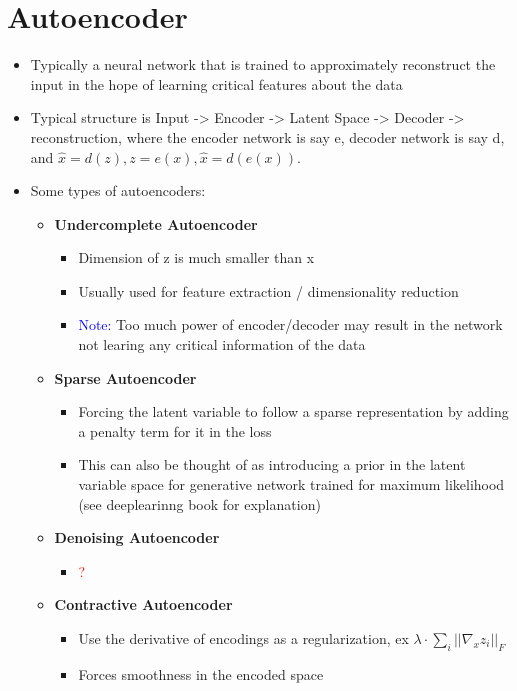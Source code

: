 \documentclass[11pt]{article}
\newcommand{\red}[1]{\textcolor{red}{#1}}
\newcommand{\blue}[1]{\textcolor{blue}{#1}}
\newcommand{\xhat}{\hat{x}}
\begin{document}
    \section{Autoencoder}
    \begin{itemize}
        \item Typically a neural network that is trained to approximately reconstruct the input in the hope of learning critical features about the data
        \item Typical structure is Input -> Encoder -> Latent Space -> Decoder -> reconstruction, where the encoder network is say e, decoder network is say d, and $\xhat = d(z), z = e(x), \xhat=d(e(x))$.
        \item Some types of autoencoders:
            \begin{itemize}
                \item \textbf{Undercomplete Autoencoder}
                    \begin{itemize}
                        \item Dimension of z is much smaller than x
                        \item Usually used for feature extraction / dimensionality reduction
                        \item \blue{Note:} Too much power of encoder/decoder may result in the network not learing any critical information of the data
                    \end{itemize}
                \item \textbf{Sparse Autoencoder}
                    \begin{itemize}
                        \item Forcing the latent variable to follow a sparse representation by adding a penalty term for it in the loss
                        \item This can also be thought of as introducing a prior in the latent variable space for generative network trained for maximum likelihood (see deeplearinng book for explanation)
                    \end{itemize}
                \item \textbf{Denoising Autoencoder}
                    \begin{itemize}
                        \item \red{?}
                    \end{itemize}
                \item \textbf{Contractive Autoencoder}
                    \begin{itemize}
                        \item Use the derivative of encodings as a regularization, ex $\lambda \cdot \sum_i || \nabla_x z_i ||_F$
                        \item Forces smoothness in the encoded space
                    \end{itemize}
            \end{itemize}
    \end{itemize}
\end{document}
